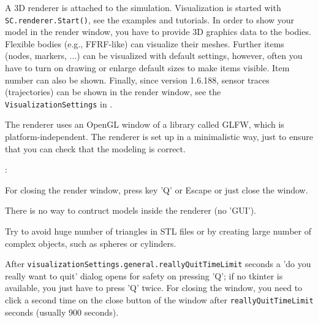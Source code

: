 A 3D renderer is attached to the simulation. Visualization is started with  \texttt{SC.renderer.Start()}, see the examples and tutorials.
In order to show your model in the render window, you have to provide 3D graphics data to the bodies. Flexible bodies (e.g., FFRF-like) can visualize their meshes. Further items (nodes, markers, ...) can be visualized with default settings, however, often you have to turn on drawing or enlarge default sizes to make items visible. Item number can also be shown.
Finally, since version 1.6.188, sensor traces (trajectories) can be shown in the render window, see the \texttt{VisualizationSettings} in  .

The renderer uses an OpenGL window of a library called GLFW, which is platform-independent. 
The renderer is set up in a minimalistic way, just to ensure that you can check that the modeling is correct. 

\noindent {}:
\bi
  \item For closing the render window, press key 'Q' or Escape or just close the window.
  \item There is no way to contruct models inside the renderer (no 'GUI').
  \item Try to avoid huge number of triangles in STL files or by creating large number of complex objects, such as spheres or cylinders.
  \item After \texttt{visualizationSettings.general.reallyQuitTimeLimit} seconds a 'do you really want to quit' dialog opens for safety on pressing 'Q'; if no tkinter is available, you just have to press 'Q' twice. For closing the window, you need to click a second time on the close button of the window after \texttt{reallyQuitTimeLimit} seconds (usually 900 seconds).
\ei
 
